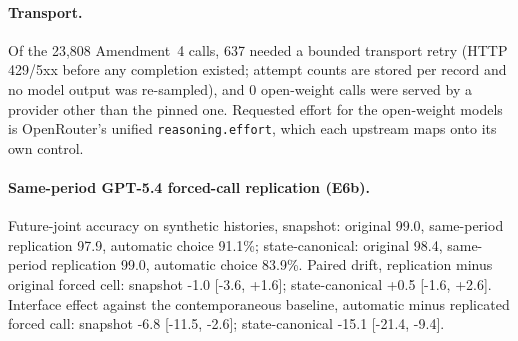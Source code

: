 \paragraph{Transport.} Of the 23,808 Amendment~4 calls, 637 needed a bounded transport retry (HTTP 429/5xx before any completion existed; attempt counts are stored per record and no model output was re-sampled), and 0 open-weight calls were served by a provider other than the pinned one. Requested effort for the open-weight models is OpenRouter's unified \texttt{reasoning.effort}, which each upstream maps onto its own control.


\paragraph{Same-period GPT-5.4 forced-call replication (E6b).} Future-joint accuracy on synthetic histories, snapshot: original 99.0, same-period replication 97.9, automatic choice 91.1\%; state-canonical: original 98.4, same-period replication 99.0, automatic choice 83.9\%. Paired drift, replication minus original forced cell: snapshot -1.0 [-3.6, +1.6]; state-canonical +0.5 [-1.6, +2.6]. Interface effect against the contemporaneous baseline, automatic minus replicated forced call: snapshot -6.8 [-11.5, -2.6]; state-canonical -15.1 [-21.4, -9.4].


